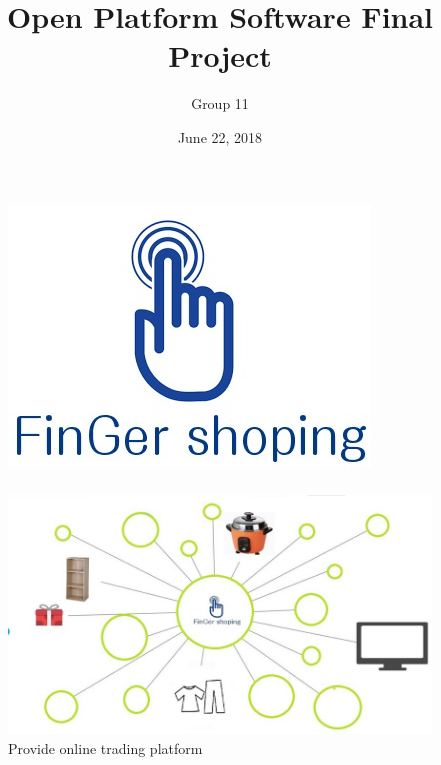 \documentclass{beamer}
\title {Open Platform Software Final Project}
\author{Group 11} %
\institute[UCLA] %
{

1041411 朱昆毅\\
1041427 李家賢\\
1041428 呂宜叡\\
1041429 王俊傑\\
1041448 陳冠穎\\ %


\medskip
\textit{} %
}
\date{June 22, 2018} %
\begin{document}
\begin{CJK}{UTF8}{bsmi}
\begin{frame}
\titlepage %
\end{frame}



\begin{frame}
\frametitle{} %
\begin{figure}
\includegraphics[width=0.5\linewidth]{logo.jpg}

\end{figure}
\end{frame}

\begin{frame}
\frametitle{} %
\begin{figure}
\includegraphics[width=1\linewidth]{test.jpg}
Provide online trading platform
\end{figure}
\end{frame}



\end{CJK}
\end{document}
